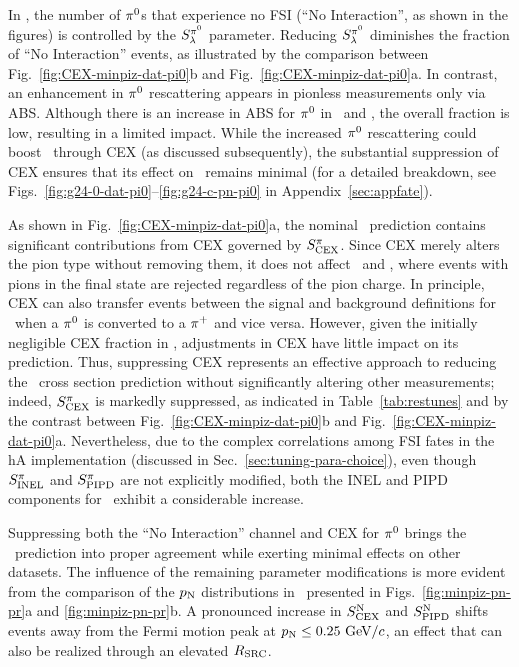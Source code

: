     In \minpiz, the number of $\pi^0$s that experience no FSI (``No Interaction'', as shown in the figures) is controlled by the $S_\lambda^{\pi^{0}}$ parameter. 
    Reducing $S_\lambda^{\pi^{0}}$ diminishes the fraction of ``No Interaction'' events, as illustrated by the comparison between Fig.~\ref{fig:CEX-minpiz-dat-pi0}b and Fig.~\ref{fig:CEX-minpiz-dat-pi0}a. 
    In contrast, an enhancement in $\pi^0$ rescattering appears in pionless measurements only via ABS. 
    Although there is an increase in ABS for $\pi^0$ in \ttkzpi\ and \minzpi, the overall fraction is low, resulting in a limited impact. 
    While the increased $\pi^0$ rescattering could boost \ttkpip\ through CEX (as discussed subsequently), the substantial suppression of CEX ensures that its effect on \ttkpip\ remains minimal (for a detailed breakdown, see Figs.~\ref{fig:g24-0-dat-pi0}--\ref{fig:g24-c-pn-pi0} in Appendix~\ref{sec:appfate}). 

    As shown in Fig.~\ref{fig:CEX-minpiz-dat-pi0}a, the nominal \minpiz\ prediction contains significant contributions from CEX governed by $S_\textrm{CEX}^{\pi}$. 
    Since CEX merely alters the pion type without removing them, it does not affect \ttkzpi\ and \minzpi, where events with pions in the final state are rejected regardless of the pion charge. 
    In principle, CEX can also transfer events between the signal and background definitions for \ttkpip\ when a $\pi^0$ is converted to a $\pi^+$ and vice versa. 
    However, given the initially negligible CEX fraction in \ttkpip, adjustments in CEX have little impact on its prediction. 
    Thus, suppressing CEX represents an effective approach to reducing the \minpiz\ cross section prediction without significantly altering other measurements; indeed, $S_\textrm{CEX}^{\pi}$ is markedly suppressed, as indicated in Table~\ref{tab:restunes} and by the contrast between Fig.~\ref{fig:CEX-minpiz-dat-pi0}b and Fig.~\ref{fig:CEX-minpiz-dat-pi0}a. 
    Nevertheless, due to the complex correlations among FSI fates in the hA implementation (discussed in Sec.~\ref{sec:tuning-para-choice}), even though $S_\textrm{INEL}^{\pi}$ and $S_\textrm{PIPD}^{\pi}$ are not explicitly modified, both the INEL and PIPD components for \minpiz\ exhibit a considerable increase.

    Suppressing both the ``No Interaction'' channel and CEX for $\pi^0$ brings the \minpiz\ prediction into proper agreement while exerting minimal effects on other datasets.  
    The influence of the remaining parameter modifications is more evident from the comparison of the $p_\textrm{N}$ distributions in \minpiz\ presented in Figs.~\ref{fig:minpiz-pn-pr}a and \ref{fig:minpiz-pn-pr}b. 
    A pronounced increase in $S_\textrm{CEX}^\textrm{N}$ and $S_\textrm{PIPD}^\textrm{N}$ shifts events away from the Fermi motion peak at $p_\textrm{N}\leq0.25~\textrm{GeV}/c$, an effect that can also be realized through an elevated $R_\textrm{SRC}$. 

